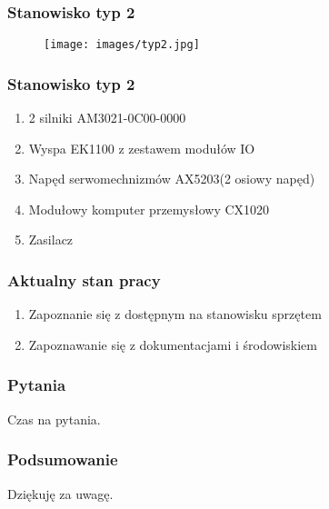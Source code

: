 \documentclass[ucs]{beamer}
\begin{document}
\begin{frame}
\frametitle{Stanowisko typ 2}
\begin{figure}[!htb]	
\centering 	          
\texttt{[image: images/typ2.jpg]}
\end{figure}
\end{frame}

\begin{frame}
\frametitle{Stanowisko typ 2}
\begin{enumerate}
    \item 2 silniki AM3021-0C00-0000
    \item Wyspa EK1100 z zestawem modułów IO
    \item Napęd serwomechnizmów AX5203(2 osiowy napęd)
    \item Modułowy komputer przemysłowy CX1020
    \item Zasilacz
\end{enumerate}
\end{frame}

\begin{frame}
\frametitle{Aktualny stan pracy}
\begin{enumerate}
    \item Zapoznanie się z dostępnym na stanowisku sprzętem
    \item Zapoznawanie się z dokumentacjami i środowiskiem
\end{enumerate}
\end{frame}

\begin{frame}
\frametitle{Pytania}
Czas na pytania.
\end{frame}

\begin{frame}
\frametitle{Podsumowanie}
Dziękuję za uwagę.
\end{frame}
\end{document}
